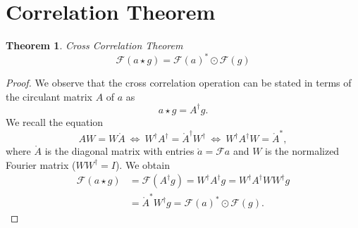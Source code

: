\documentclass[11pt]{scrartcl}
\newcommand{\FT}{\mathcal{F}}
\newtheorem*{theorem}{Theorem}
\begin{document}
\section{Correlation Theorem}

\begin{theorem} Cross Correlation Theorem
\[
 \FT\left(a\star g\right) = \FT(a)^*\odot\FT(g)
\]
\end{theorem}
\begin{proof}
We observe that the cross correlation operation can be stated in terms of the circulant matrix $A$ of $a$ as
\[
 a\star g = A^\dagger g.
\]
We recall the equation 
\[
 AW = W\mathring A {\ }\Leftrightarrow{\ } W^\dagger A^\dagger = \mathring{A}^\dagger W^\dagger {\ }\Leftrightarrow{\ } W^\dagger A^\dagger W = \mathring{A}^*,
\]
where $\mathring A$ is the diagonal matrix with entries $\mathring{a} = \FT a$ and $W$ is the normalized Fourier matrix ($WW^\dagger=I$).
We obtain
\begin{align*}
\FT\left(a\star g\right) &= \FT\left(A^\dagger g\right) = W^\dagger A^\dagger g = W^\dagger A^\dagger W W^\dagger g\\
			 &= \mathring{A}^* W^\dagger g = \FT(a)^*\odot\FT(g).
\end{align*}
\end{proof}
\end{document}
